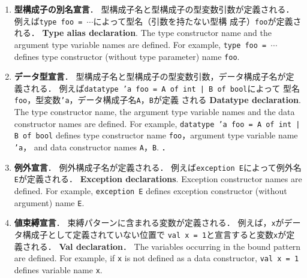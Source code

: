 \documentclass{jbook}
\newcommand{\code}[1]{\mbox{\large\tt #1}}
\begin{document}
\begin{enumerate}
\item
\ifjp%
 {\bf 型構成子の別名宣言}．
	型構成子名と型構成子の型変数引数が定義される．
	例えば\code{type foo = $\cdots$}によって型名（引数を持たない型構
成子）\code{foo}が定義される．
\else%
 {\bf Type alias declaration}.
	The type constructor name and the argument type variable names
are defined. 
	For example, \code{type foo = $\cdots$} defines
type constructor (without type parameter) name
\code{foo}.
\fi%

\item
\ifjp%
 {\bf データ型宣言}．
	型構成子名と型構成子の型変数引数，データ構成子名が定義される．
	例えば\code{datatype 'a foo = A of int | B of bool}によって
型名\code{foo}，型変数\code{'a}，データ構成子名\code{A}，\code{B}が定義
される
\else%
 {\bf Datatype declaration}.
	The type constructor name, the argument type variable names and 
the data constructor names are defined.
	For example, \code{datatype 'a foo = A of int | B of bool} defines
type constructor name \code{foo}，argument type variable name \code{'a}，
and data constructor names \code{A}，\code{B}.
\fi%
．
\item
\ifjp%
 {\bf 例外宣言}．
	例外構成子名が定義される．
	例えば\code{exception E}によって例外名\code{E}が定義される．
\else%
 {\bf Exception declarations}.
	Exception constructor names are defined.
	For example, \code{exception E} defines exception constructor
(without argument) name \code{E}.
\fi%

\item
\ifjp%
 {\bf 値束縛宣言}．
	束縛パターンに含まれる変数が定義される．
	例えば，\code{x}がデータ構成子として定義されていない位置で
\code{val x = 1}と宣言すると変数\code{x}が定義される．
\else%
 {\bf Val declaration}．
	The variables occurring in the bound pattern are defined.
	For example, if \code{x} is not defined as a data constructor,
\code{val x = 1} defines variable name \code{x}.
\fi%


\end{enumerate}
\end{document}
